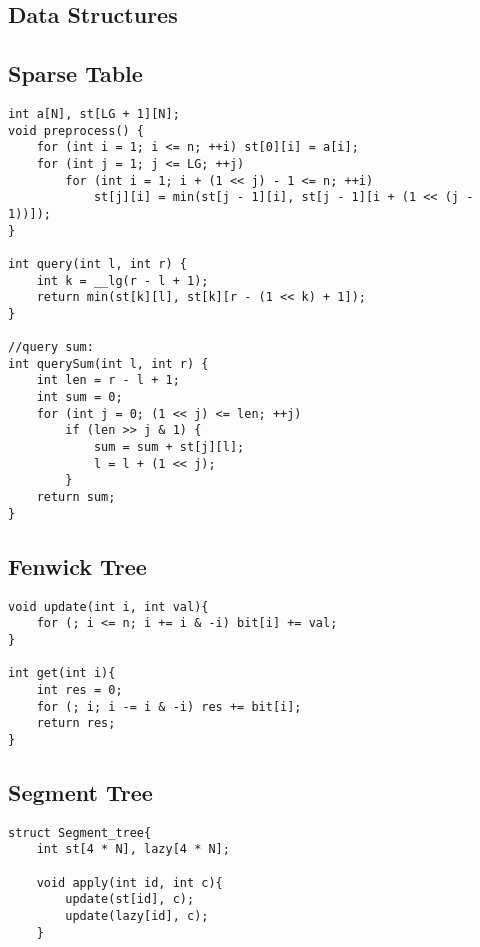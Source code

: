 \documentclass[11pt,a4paper]{article}
\begin{document}
\setcounter{tocdepth}{2}
\begin{multicols}{2}
\tableofcontents
\end{multicols}
\newpage

\begin{multicols*}{2}

\section{Data Structures}

\subsection{Sparse Table}
\begin{lstlisting}
int a[N], st[LG + 1][N];
void preprocess() {
    for (int i = 1; i <= n; ++i) st[0][i] = a[i];
    for (int j = 1; j <= LG; ++j)
        for (int i = 1; i + (1 << j) - 1 <= n; ++i)
            st[j][i] = min(st[j - 1][i], st[j - 1][i + (1 << (j - 1))]);
}

int query(int l, int r) {
    int k = __lg(r - l + 1);
    return min(st[k][l], st[k][r - (1 << k) + 1]);
}

//query sum:
int querySum(int l, int r) {
    int len = r - l + 1;
    int sum = 0;
    for (int j = 0; (1 << j) <= len; ++j)
        if (len >> j & 1) {
            sum = sum + st[j][l];
            l = l + (1 << j);
        }
    return sum;
}
\end{lstlisting}

\subsection{Fenwick Tree}
\begin{lstlisting}
void update(int i, int val){
    for (; i <= n; i += i & -i) bit[i] += val;
}

int get(int i){
    int res = 0;
    for (; i; i -= i & -i) res += bit[i];
    return res;
}
\end{lstlisting}

\subsection{Segment Tree}
\begin{lstlisting}
struct Segment_tree{
	int st[4 * N], lazy[4 * N];
	
    void apply(int id, int c){
        update(st[id], c);
        update(lazy[id], c);
    }


\end{lstlisting}
\end{multicols*}
\end{document}
